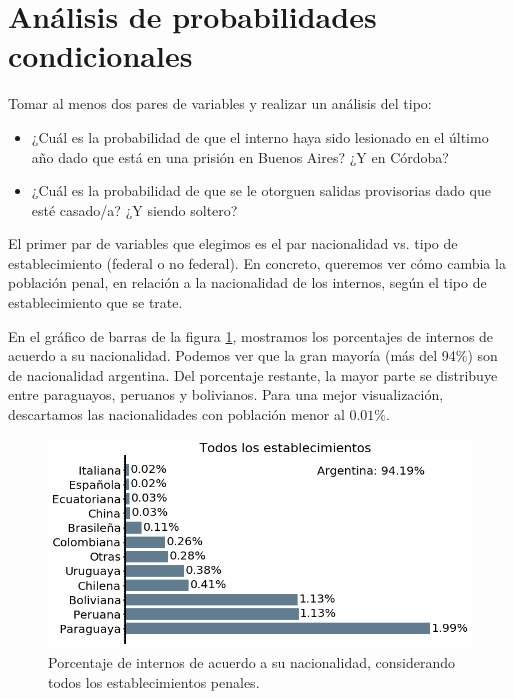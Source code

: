 \documentclass[10pt]{article}
\begin{document}
\section{Análisis de probabilidades condicionales}

Tomar al menos dos pares de variables y realizar un análisis del tipo:

\begin{itemize}
	\item ¿Cuál es la probabilidad de que el interno haya sido lesionado en el último año dado que está en una prisión en Buenos Aires? ¿Y en Córdoba?
	\item ¿Cuál es la probabilidad de que se le otorguen salidas provisorias dado que esté casado/a? ¿Y siendo soltero?
\end{itemize}

El primer par de variables que elegimos es el par nacionalidad vs. tipo de establecimiento (federal o no federal). En concreto, queremos ver c\'omo cambia la poblaci\'on penal, en relaci\'on a la nacionalidad de los internos, seg\'un el tipo de establecimiento que se trate. 

En el gr\'afico de barras de la figura \ref{fig:nacionalidad_todos}, mostramos los porcentajes de internos de acuerdo a su nacionalidad. Podemos ver que la gran mayor\'ia (m\'as del 94\%) son de nacionalidad argentina. Del porcentaje restante, la mayor parte se distribuye entre paraguayos, peruanos y bolivianos. Para una mejor visualizaci\'on, descartamos las nacionalidades con poblaci\'on menor al $0.01\%$.

\begin{figure}[H]
	\centering
\includegraphics[scale=0.40]{graficos/nacionalidad_bar.png}
	\caption{Porcentaje de internos de acuerdo a su nacionalidad, considerando todos los establecimientos penales.\label{fig:nacionalidad_todos}}
\end{figure}
\end{document}
